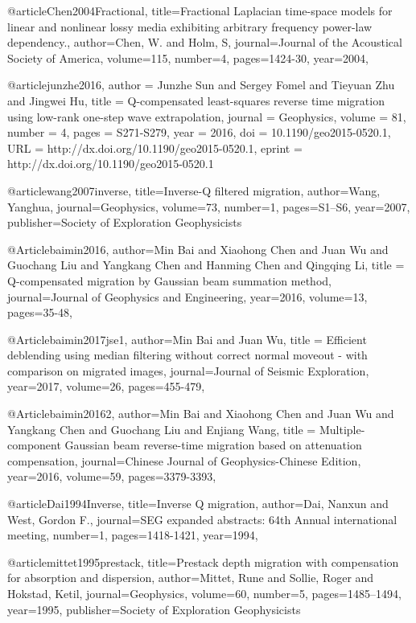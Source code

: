 {@article{Chen2004Fractional,
  title={Fractional Laplacian time-space models for linear and nonlinear lossy media exhibiting arbitrary frequency power-law dependency.},
  author={Chen, W. and Holm, S},
  journal={Journal of the Acoustical Society of America},
  volume={115},
  number={4},
  pages={1424-30},
  year={2004},
}

@article{junzhe2016,
author = {Junzhe Sun and Sergey Fomel and Tieyuan Zhu and Jingwei Hu},
title = {Q-compensated least-squares reverse time migration using low-rank one-step wave extrapolation},
journal = {Geophysics},
volume = {81},
number = {4},
pages = {S271-S279},
year = {2016},
doi = {10.1190/geo2015-0520.1},
URL = {http://dx.doi.org/10.1190/geo2015-0520.1},
eprint = {http://dx.doi.org/10.1190/geo2015-0520.1}
}

@article{wang2007inverse,
  title={Inverse-{Q} filtered migration},
  author={Wang, Yanghua},
  journal={Geophysics},
  volume={73},
  number={1},
  pages={S1--S6},
  year={2007},
  publisher={Society of Exploration Geophysicists}
}

@Article{baimin2016,
  author={Min Bai and Xiaohong Chen and Juan Wu and Guochang Liu and Yangkang Chen and Hanming Chen and Qingqing Li},
  title = {Q-compensated migration by Gaussian beam summation method},
  journal={Journal of Geophysics and Engineering},
  year=2016,
  volume=13,
  pages={35-48},
}

@Article{baimin2017jse1,
  author={Min Bai and Juan Wu},
  title = {Efficient deblending using median filtering without correct normal moveout - with comparison on migrated images},
  journal={Journal of Seismic Exploration},
  year=2017,
  volume=26,
  pages={455-479},
}

@Article{baimin20162,
  author={Min Bai and Xiaohong Chen and Juan Wu and Yangkang Chen and Guochang Liu and  Enjiang Wang},
  title = {Multiple-component Gaussian beam reverse-time migration based on attenuation compensation},
  journal={Chinese Journal of Geophysics-Chinese Edition},
  year=2016,
  volume=59,
  pages={3379-3393},
}

@article{Dai1994Inverse,
  title={Inverse {Q} migration},
  author={Dai, Nanxun and West, Gordon F.},
  journal={SEG expanded abstracts: 64th Annual international meeting},
  number={1},
  pages={1418-1421},
  year={1994},
}

@article{mittet1995prestack,
  title={Prestack depth migration with compensation for absorption and dispersion},
  author={Mittet, Rune and Sollie, Roger and Hokstad, Ketil},
  journal={Geophysics},
  volume={60},
  number={5},
  pages={1485--1494},
  year={1995},
  publisher={Society of Exploration Geophysicists}
}

}
